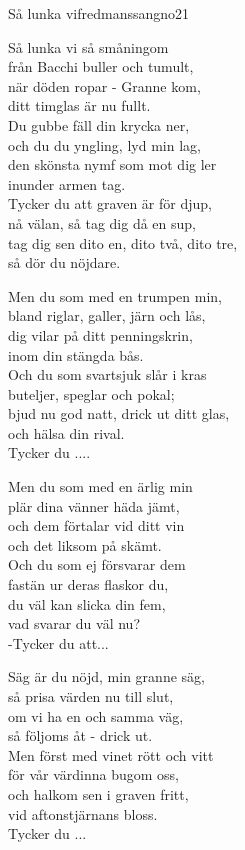 \begin{song}{Så lunka vi}{fredmanssangno21}
\begin{vers}
Så lunka vi så småningom \\
från Bacchi buller och tumult,\\
när döden ropar - Granne kom,\\
ditt timglas är nu fullt.\\
Du gubbe fäll din krycka ner,\\
och du du yngling, lyd min lag,\\
den skönsta nymf som mot dig ler\\
inunder armen tag.\\
Tycker du att graven är för djup,\\
nå välan, så tag dig då en sup,\\
tag dig sen dito en, dito två, dito tre,\\
så dör du nöjdare.\\
\end{vers}
\begin{vers}
Men du som med en trumpen min, \\
bland riglar, galler, järn och lås,\\
dig vilar på ditt penningskrin,\\
inom din stängda bås.\\
Och du som svartsjuk slår i kras\\
buteljer, speglar och pokal;\\
bjud nu god natt, drick ut ditt glas,\\
och hälsa din rival.\\
Tycker du ....\\
\end{vers}
\newp
\begin{vers}
Men du som med en ärlig min\\
plär dina vänner häda jämt,\\
och dem förtalar vid ditt vin\\
och det liksom på skämt.\\
Och du som ej försvarar dem\\
fastän ur deras flaskor du,\\
du väl kan slicka din fem,\\
vad svarar du väl nu?\\
-Tycker du att...\\
\end{vers}
\begin{vers}
Säg är du nöjd, min granne säg, \\
så prisa värden nu till slut,\\
om vi ha en och samma väg,\\
så följoms åt - drick ut.\\
Men först med vinet rött och vitt\\
för vår värdinna bugom oss,\\
och halkom sen i graven fritt,\\
vid aftonstjärnans bloss.\\
Tycker du ...\\
\end{vers}
\end{song}


